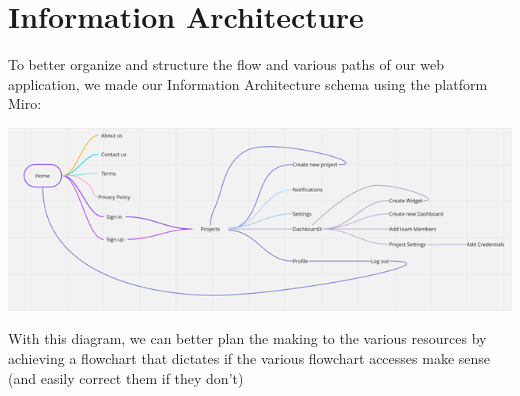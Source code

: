 \documentclass[a4paper,twoside,10pt]{report}
\begin{document}
\section{Information Architecture}
To better organize and structure the flow and various paths of our web application, we made our Information Architecture schema using the platform Miro:
\\ \newline
\begin{center}
    \includegraphics[width=\textwidth]{information-architecture.png}
\end{center}

With this diagram, we can better plan the making to the various resources by achieving a flowchart that dictates if the various flowchart accesses make sense (and easily correct them if they don't)
\end{document}
